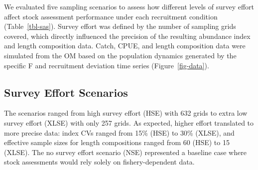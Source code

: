 \documentclass[
  letterpaper,
  12pt,
  letterpaper]{report}
\begin{document}
We evaluated five sampling scenarios to assess how different levels of
survey effort affect stock assessment performance under each recruitment
condition (Table~\ref{tbl-sas}). Survey effort was defined by the number
of sampling grids covered, which directly influenced the precision of
the resulting abundance index and length composition data. Catch, CPUE,
and length composition data were simulated from the OM based on the
population dynamics generated by the specific F and recruitment
deviation time series (Figure~\ref{fig-data}).

\subsection{Survey Effort Scenarios}\label{survey-effort-scenarios}

The scenarios ranged from high survey effort (HSE) with 632 grids to
extra low survey effort (XLSE) with only 257 grids. As expected, higher
effort translated to more precise data: index CVs ranged from 15\% (HSE)
to 30\% (XLSE), and effective sample sizes for length compositions
ranged from 60 (HSE) to 15 (XLSE). The no survey effort scenario (NSE)
represented a baseline case where stock assessments would rely solely on
fishery-dependent data.
\end{document}
